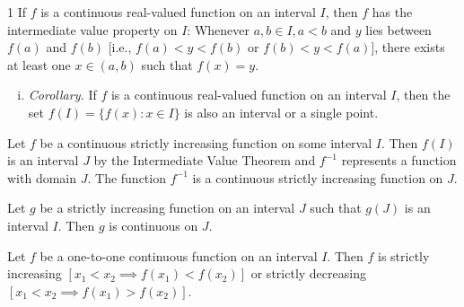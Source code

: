 \begin{theo}{1}
	If $f$ is a continuous real-valued function on an interval $I$, then $f$ has
	the intermediate value property on $I$: Whenever $a, b \in I, a < b$ and $y$
	lies between $f(a)$ and $f(b)$ [i.e., $f(a) < y < f(b)$ or $f(b) < y < f(a)$],
	there exists at least one $x \in (a, b)$ such that $f(x) = y$.
	\begin{enumerate}[(i)]
		\item \textit{Corollary.} If $f$ is a continuous real-valued function on an interval $I$, then the set $f(I) = \{f(x) : x \in I\}$ is also an interval or a single point.
	\end{enumerate}
\end{theo}

\begin{theo}{1}
	Let $f$ be a continuous strictly increasing function on some interval $I$. Then $f(I)$ is an interval $J$ by the Intermediate Value Theorem and $f^{-1}$ represents a function with domain $J$. The function $f^{-1}$ is a continuous strictly increasing function on $J$.
\end{theo}

\begin{theo}{1}
	Let $g$ be a strictly increasing function on an interval $J$ such that $g(J)$ is an interval $I$. Then $g$ is continuous on $J$.
\end{theo}

\begin{theo}{1}
	Let $f$ be a one-to-one continuous function on an interval $I$. Then
	$f$ is strictly increasing $[x_1 < x_2 \implies f(x_1) < f(x_2)]$ or strictly
	decreasing $[x_1 < x_2 \implies f(x_1) > f(x_2)]$.
\end{theo}

\newpage

